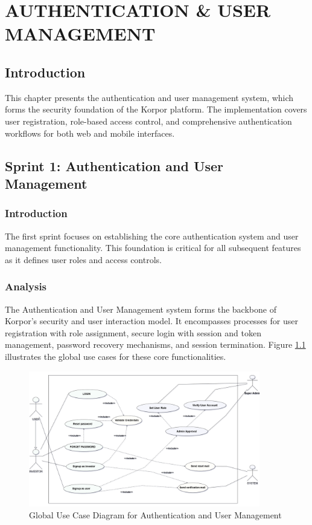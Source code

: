 \chapter{AUTHENTICATION \& USER MANAGEMENT}

\section*{Introduction}
This chapter presents the authentication and user management system, which forms the security foundation of the Korpor platform. The implementation covers user registration, role-based access control, and comprehensive authentication workflows for both web and mobile interfaces.

 
\section{Sprint 1: Authentication and User Management}

\subsection*{Introduction}
The first sprint focuses on establishing the core authentication system and user management functionality. This foundation is critical for all subsequent features as it defines user roles and access controls.

\subsection{Analysis}
The Authentication and User Management system forms the backbone of Korpor's security and user interaction model. It encompasses processes for user registration with role assignment, secure login with session and token management, password recovery mechanisms, and session termination. Figure \ref{fig:auth-usermgmt-usecase} illustrates the global use cases for these core functionalities.
\newpage
\begin{figure}[htbp]
    \centering
    \includegraphics[width=0.9\textwidth]{images/auth-usermgmt-usecase.png} 
    \caption{Global Use Case Diagram for Authentication and User Management}
    \label{fig:auth-usermgmt-usecase}
\end{figure}


